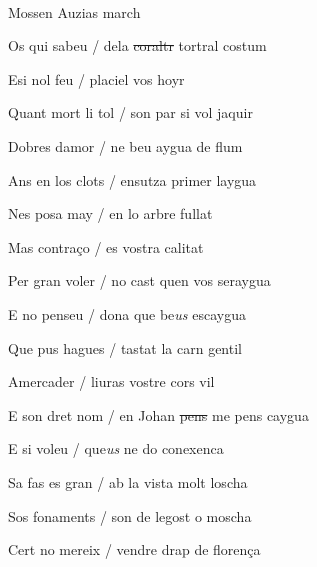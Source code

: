 \documentclass[12pt]{article}
\renewcommand{\espaiAbansEtiquetaPoema}{\vspace{0ex}}
\begin{document}
\begin{estrofa}

\espaiAbansEtiquetaPoema

\\

\begin{rubrica}

Mossen Auzias march

\end{rubrica}

\end{estrofa}


\begin{estrofa}

 Os qui sabeu / dela \sout{coraltr} tortral costum

 Esi nol feu / placiel vos hoyr

 Quant mort li tol / son par si vol jaquir

 Dobres damor / ne beu aygua de flum

 Ans en los clots / ensutza primer laygua

 Nes posa may / en lo arbre fullat

 Mas contra\c{c}o / es vostra calitat

 Per gran voler / no cast quen vos seraygua

\end{estrofa}



\begin{estrofa}

 E no penseu / dona que be\textit{us} escaygua

 Que pus hagues / tastat la carn gentil

 Amercader / liuras vostre cors vil

 E son dret nom / en Johan \sout{pens} me pens caygua

 E si voleu / que\textit{us} ne do conexenca

 Sa fas es gran / ab la vista molt loscha

 Sos fonaments / son de legost o moscha

 Cert no mereix / vendre drap de floren\c{c}a

\end{estrofa}
\end{document}
